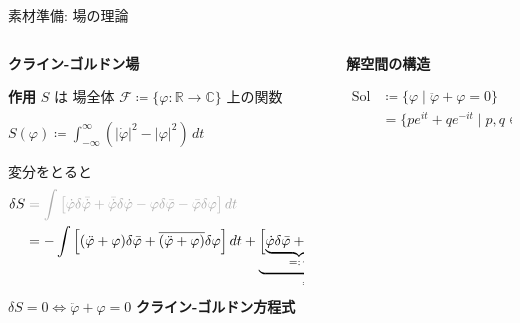 \documentclass[10pt, aspectratio=169]{beamer}
\let\oldtextbf\textbf
\renewcommand{\textbf}[1]{\oldtextbf{\boldmath #1}}
\newcommand{\hl}[1]{\colorbox{hilight}{\(\displaystyle #1\)}}
\begin{document}
\begin{frame}{素材準備: 場の理論}
\footnotesize
\begin{columns}[T]
  \begin{column}{0.51\textwidth}
    {\large\bfseries\color{indigo} クライン-ゴルドン場}
    \par\smallskip
    \textbf{作用} $S$ は 場全体 $\mathcal{F} \coloneqq \{\varphi: \mathbb{R} \to \mathbb{C}\}$ 上の関数
    \begin{minipage}[c]{0.7\columnwidth}
      \begin{center}\hl{S(\varphi) \coloneqq \int_{-\infty}^{\infty} (|\dot{\varphi}|^2 - |\varphi|^2) \, dt}\end{center}
    \end{minipage}\hfill
    \begin{minipage}[c]{0.25\columnwidth}
    \end{minipage}

    \smallskip
    変分をとると
    \begin{align*}
      \delta S &\color{gray!65} = \int \left[\dot{\varphi}\delta\bar{\dot{\varphi}} + \bar{\dot{\varphi}}\delta\dot{\varphi} - \varphi\delta\bar{\varphi} - \bar{\varphi}\delta\varphi\right] dt \\
      &= -\int \left[(\ddot{\varphi}+\varphi)\delta\bar{\varphi} + \overline{(\ddot{\varphi}+\varphi)}\delta\varphi \right] dt + \underbrace{\Bigl[\underbrace{\dot{\varphi}\delta\bar{\varphi} + \bar{\dot{\varphi}}\delta\varphi}_{=:\,\gamma}\Bigr]_{-\infty}^{\infty}}_{= 0}
    \end{align*}
    \hl{\delta S = 0 \Leftrightarrow \ddot{\varphi} + \varphi = 0} \textbf{クライン-ゴルドン方程式}
  \end{column}
  \begin{column}{0.01\textwidth}
    \rule{0.5pt}{7.5cm}
  \end{column}
  \begin{column}{0.43\textwidth}
    {\large\bfseries\color{indigo} 解空間の構造}
    \par\smallskip
    \begin{center}\hl{\begin{aligned}
      \mathrm{Sol} &\coloneqq \{\varphi \mid \ddot{\varphi}+\varphi=0\}\\
      &= \{pe^{it}+qe^{-it} \mid p,q \in \mathbb{C}\}
    \end{aligned}}\end{center}


\end{column}
\end{columns}
\end{frame}
\end{document}
